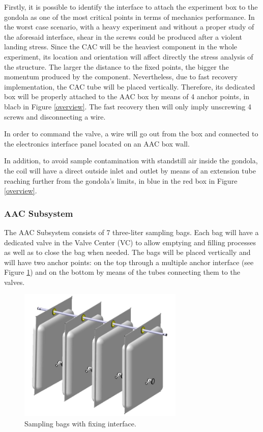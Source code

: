 \smallskip
Firstly, it is possible to identify the interface to attach the experiment box to the gondola as one of the most critical points in terms of mechanics performance. In the worst case scenario, with a heavy experiment and without a proper study of the aforesaid interface, shear in the screws could be produced after a violent landing stress. Since the CAC will be the heaviest component in the whole experiment, its location and orientation will affect directly the stress analysis of the structure. The larger the distance to the fixed points, the bigger the momentum produced by the component. Nevertheless, due to fast recovery implementation, the CAC tube will be placed vertically. Therefore, its dedicated box will be properly attached to the AAC box by means of 4 anchor points, in blacb in Figure \ref{overview}. The fast recovery then will only imply unscrewing 4 screws and disconnecting a wire. 

\smallskip
In order to command the valve, a wire will go out from the box and connected to the electronics interface panel located on an AAC box wall.

\smallskip
In addition, to avoid sample contamination with standstill air inside the gondola, the coil will have a direct outside inlet and outlet by means of an extension tube reaching further from the gondola’s limits, in blue in the red box in Figure \ref{overview}.


\subsubsection{AAC Subsystem}

The AAC Subsystem consists of 7 three-liter sampling bags. Each bag will have a dedicated valve in the Valve Center (VC) to allow emptying and filling processes as well as to close the bag when needed. The bags will be placed vertically and will have two anchor points: on the top through a  multiple anchor interface (see Figure \ref{anchor_bags}) and on the bottom by means of the tubes connecting them to the valves.


\begin{figure}[!ht]
    \centering
    \includegraphics[width=0.7\textwidth]{4-experiment-design/img/bags_assembly.jpg}
    \caption{Sampling bags with fixing interface.}
    \label{anchor_bags}
\end{figure}


